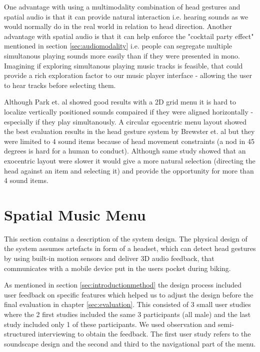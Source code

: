 One advantage with using a multimodality combination of head gestures and spatial audio is that it can provide natural interaction \cite{gaver_auditory_1986} i.e. hearing sounds as we would normally do in the real world in relation to head direction. Another advantage with spatial audio is that it can help enforce the "cocktail party effect" mentioned in section \ref{sec:audiomodality} i.e. people can segregate multiple simultanous playing sounds more easily than if they were presented in mono. Imagining if exploring simultanous playing music tracks is feasible, that could provide a rich exploration factor to our music player interface - allowing the user to hear tracks before selecting them.

Although Park et. al \cite{park_gaze-directed_2011} showed good results with a 2D grid menu it is hard to localize vertically positioned sounds compaired if they were aligned horizontally - especially if they play simultanously. A circular egocentric menu layout showed the best evaluation results in the head gesture system by Brewster et. al \cite{brewster_multimodaleyes-freeinteraction_2003} but they were limited to 4 sound items because of head movement constraints (a nod in 45 degrees is hard for a human to conduct). Although same study showed that an exocentric layout were slower it would give a more natural selection (directing the head against an item and selecting it) and provide the opportunity for more than 4 sound items.


\section{Spatial Music Menu}
This section contains a description of the system design. The physical design of the system assumes artefacts in form of a headset, which can detect head gestures by using built-in motion sensors and deliver 3D audio feedback, that communicates with a mobile device put in the users pocket during biking.

As mentioned in section \ref{sec:introductionmethod} the design process included user feedback on specific features which helped us to adjust the design before the final evaluation in chapter \ref{sec:evaluation}. This consisted of 3 small user studies where the 2 first studies included the same 3 participants (all male) and the last study included only 1 of these participants. We used observation and semi-structured interviewing \cite{benyon_designing_2010} to obtain the feedback. The first user study refers to the soundscape design and the second and third to the navigational part of the menu.


